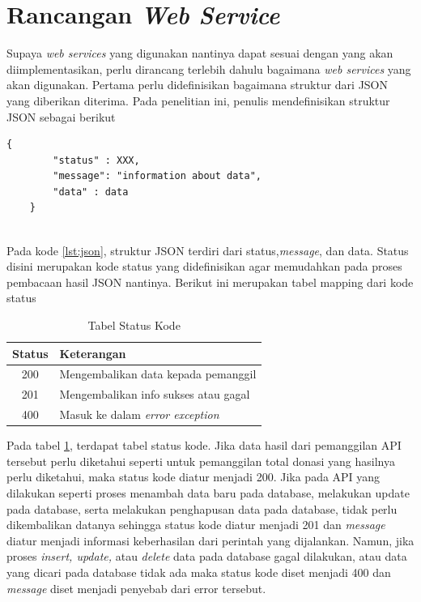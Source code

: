 \section{Rancangan \textit{Web Service}}

	Supaya \textit{web services} yang digunakan nantinya dapat sesuai dengan yang akan diimplementasikan, perlu dirancang terlebih dahulu bagaimana \textit{web services} yang akan digunakan. Pertama perlu didefinisikan bagaimana struktur dari JSON yang diberikan diterima. Pada penelitian ini, penulis mendefinisikan struktur JSON sebagai berikut
	
	\begin{minipage}{\linewidth}
	\begin{lstlisting}[caption={Struktur JSON \textit{web services}}, label={lst:json}]
	{
		"status" : XXX,
		"message": "information about data",
		"data" : data
	}
	\end{lstlisting}
	\end{minipage} \\

	Pada kode \ref{lst:json}, struktur JSON terdiri dari status,\textit{message}, dan data. Status disini merupakan kode status yang didefinisikan agar memudahkan pada proses pembacaan hasil JSON nantinya. Berikut ini merupakan tabel mapping dari kode status
	
	\begin{table}
		\centering
		\caption{Tabel Status Kode}
		\label{tab:statuscode}
		\begin{tabular}{| c | l |}
			\hline
			Status & Keterangan \\ 
			\hline
			200 & Mengembalikan data kepada pemanggil \\
			201 & Mengembalikan info sukses atau gagal \\
			400 & Masuk ke dalam \textit{error exception} \\
			\hline
		\end{tabular}
	\end{table}
	
	Pada tabel \ref{tab:statuscode}, terdapat tabel status kode. Jika data hasil dari pemanggilan API tersebut perlu diketahui seperti untuk pemanggilan total donasi yang hasilnya perlu diketahui, maka status kode diatur menjadi 200. Jika pada API yang dilakukan seperti proses menambah data baru pada database, melakukan update pada database, serta melakukan penghapusan data pada database, tidak perlu dikembalikan datanya sehingga status kode diatur menjadi 201 dan \textit{message} diatur menjadi informasi keberhasilan dari perintah yang dijalankan. Namun, jika proses \textit{insert, update,} atau \textit{delete} data pada database gagal dilakukan, atau data yang dicari pada database tidak ada maka status kode diset menjadi 400 dan \textit{message} diset menjadi penyebab dari error tersebut.
	
